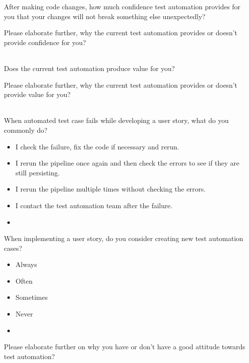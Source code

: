 \begin{question}[resume]
	\item After making code changes, how much confidence test automation provides for you that your changes will not break something else unexpectedly?\redcross\\
	\item Please elaborate further, why the current test automation provides or doesn't provide confidence for you?\greencheckmark\label{survey_question:test_automation_confidence}\\\\
	\longtextfield
	\item Does the current test automation produce value for you?\redcross\\
	\item Please elaborate further, why the current test automation provides or doesn't provide value for you?\greencheckmark\label{survey_question:test_automation_value}\\\\
	\longtextfield
	\item When automated test case fails while developing a user story, what do you commonly do?\redcross
	\begin{itemize}[noitemsep, leftmargin=1.5em]
		\renewcommand\labelitemi{\radiobutton}
		\item I check the failure, fix the code if necessary and rerun.
		\item I rerun the pipeline once again and then check the errors to see if they are still persisting.
		\item I rerun the pipeline multiple times without checking the errors.
		\item I contact the test automation team after the failure.
		\item \othertextfield
	\end{itemize}
	\item When implementing a user story, do you consider creating new test automation cases?\redcross
	\begin{itemize}[noitemsep, leftmargin=1.5em]
		\renewcommand\labelitemi{\radiobutton}
		\item Always
		\item Often
		\item Sometimes
		\item Never
		\item \othertextfield
	\end{itemize}
	\item Please elaborate further on why you have or don't have a good attitude towards test automation?\greencheckmark\label{survey_question:test_automation_attitude}\\\\
	\longtextfield
\end{question}

